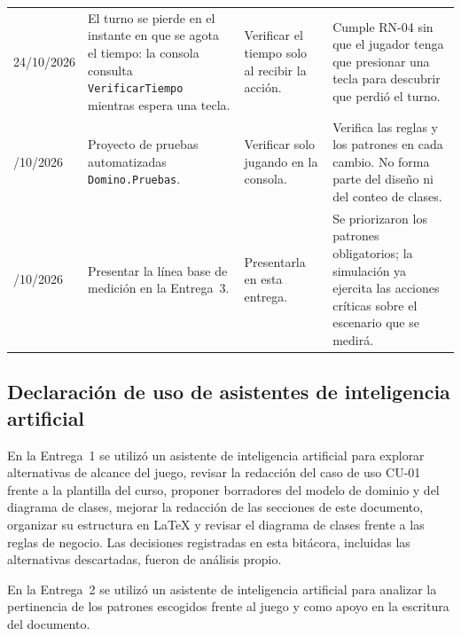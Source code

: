 {\begin{longtable}{@{}L{2.05cm}L{3.8cm}L{3.3cm}L{5.15cm}@{}}
  24/10/2026 & El turno se pierde en el instante en que se agota el tiempo: la consola consulta \texttt{VerificarTiempo} mientras espera una tecla. & Verificar el tiempo solo al recibir la acción. & Cumple RN-04 sin que el jugador tenga que presionar una tecla para descubrir que perdió el turno. \\ /10/2026 & Proyecto de pruebas automatizadas \texttt{Domino.Pruebas}. & Verificar solo jugando en la consola. & Verifica las reglas y los patrones en cada cambio. No forma parte del diseño ni del conteo de clases. \\ /10/2026 & Presentar la línea base de medición en la Entrega~3. & Presentarla en esta entrega. & Se priorizaron los patrones obligatorios; la simulación ya ejercita las acciones críticas sobre el escenario que se medirá. \\
\end{longtable}}

\subsection{Declaración de uso de asistentes de inteligencia artificial}

En la Entrega~1 se utilizó un asistente de inteligencia artificial para explorar alternativas de alcance del juego, revisar la redacción del caso de uso CU-01 frente a la plantilla del curso, proponer borradores del modelo de dominio y del diagrama de clases, mejorar la redacción de las secciones de este documento, organizar su estructura en LaTeX y revisar el diagrama de clases frente a las reglas de negocio. Las decisiones registradas en esta bitácora, incluidas las alternativas descartadas, fueron de análisis propio.

En la Entrega~2 se utilizó un asistente de inteligencia artificial para analizar la pertinencia de los patrones escogidos frente al juego y como apoyo en la escritura del documento.
